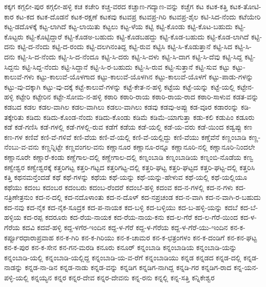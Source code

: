 {ಕಕ್ಕಗ
ಕಗ್ಗಲೀ-ಪುರ
ಕಗ್ಗಲೀ-ಹಳ್ಳಿ
ಕಚ
ಕಚೇರಿ
ಕಚ್ಚ-ವರದ
ಕಚ್ಚಾಣ-ಗದ್ಯಾಣ-ವನ್ನು
ಕಚ್ಚೆಗ
ಕಟ
ಕಟಕ-ಕತ್ತಿ
ಕಟಕ-ತೋಟಿ-ಕಾರ
ಕಟ-ಕದ
ಕಟಕ-ದೊಡನೆ
ಕಟಕ-ರಕ್ಷಣೆ
ಕಟಕವು
ಕಟವಪ್ರ
ಕಟವಪ್ರ-ಗಿರಿ
ಕಟವಪ್ರ-ಶೈಲ
ಕಟಿ-ಸಿದ-ನೆಂದು
ಕಟೆಯೇರಿ
ಕಟ್ಟ-ಡದೊಳಕ್ಕೆ
ಕಟ್ಟ-ಲಾಗಿದೆ
ಕಟ್ಟ-ಲಾಯಿತು
ಕಟ್ಟಲು
ಕಟ್ಟ-ಳೆಯ
ಕಟ್ಟಿ
ಕಟ್ಟಿ-ಕೊಂಡು
ಕಟ್ಟಿ-ಕೊಟ-ಬಹುದು
ಕಟ್ಟಿ-ಕೊಟ್ಟರು
ಕಟ್ಟಿ-ಕೊಟ್ಟಿದ್ದಾರೆ
ಕಟ್ಟಿ-ಕೊಡಅ-ಬಹುದು
ಕಟ್ಟಿ-ಕೊಡಬಹದ್ದು
ಕಟ್ಟಿ-ಕೊಡ-ಬಹುದು
ಕಟ್ಟಿ-ಕೊಡ-ಲಾಗಿದೆ
ಕಟ್ಟಿ-ದನು
ಕಟ್ಟಿ-ದ-ನೆಂದು
ಕಟ್ಟಿ-ದ-ರಂದು
ಕಟ್ಟಿ-ದಲಗಿನಂತಿದ್ದ
ಕಟ್ಟಿ-ರುವ
ಕಟ್ಟಿಸಿ
ಕಟ್ಟಿ-ಸಿ-ಕೊಡುತ್ತಾನೆ
ಕಟ್ಟಿ-ಸಿದ
ಕಟ್ಟಿ-ಸಿ-ದನು
ಕಟ್ಟಿ-ಸಿ-ದ-ನೆಂದು
ಕಟ್ಟಿ-ಸಿ-ದ-ನೆಂದೂ
ಕಟ್ಟಿ-ಸಿ-ದರು
ಕಟ್ಟಿ-ಸಿ-ದಳು
ಕಟ್ಟಿ-ಸಿ-ದಾಗ
ಕಟ್ಟಿ-ಸಿ-ದೆವು
ಕಟ್ಟಿ-ಸಿದ್ದ
ಕಟ್ಟಿ-ಸಿದ್ದನು
ಕಟ್ಟಿ-ಸಿದ್ದ-ನೆಂದು
ಕಟ್ಟಿ-ಸಿದ್ದಾನೆ
ಕಟ್ಟಿ-ಸಿ-ರ-ಬಹುದು
ಕಟ್ಟಿ-ಸಿ-ರುವ
ಕಟ್ಟಿ-ಸುತ್ತಾನೆ
ಕಟ್ಟಿ-ಸುವ
ಕಟ್ಟು
ಕಟ್ಟು-ಕಾಲುವೆ-ಗಳು
ಕಟ್ಟು-ಕಾಲುವೆ-ಯೊಳಗಾದ
ಕಟ್ಟು-ಕಾಲುವೆ-ಯೊಳಗಿನ
ಕಟ್ಟು-ಕಾಲುವೆ-ಯೊಳಗೆ
ಕಟ್ಟು-ಪಾಡು-ಗಳನ್ನು
ಕಟ್ಟು-ವು-ದಕ್ಕಾಗಿ
ಕಟ್ಟು-ವು-ದಕ್ಕೆ
ಕಟ್ಟೆ-ಕಾಲುವೆ-ಗಳನ್ನು
ಕಟ್ಟೆ-ಕೇತ-ನ-ಹಳ್ಳಿ
ಕಟ್ಟೆಯ
ಕಟ್ಟೆ-ಯನ್ನು
ಕಟ್ಟೆ-ಯಲ್ಲಿ
ಕಟ್ಟೇನ-ಹಳ್ಳಿ
ಕಟ್ಟೇರಿ
ಕಟ್ಟೇರಿನ
ಕಟ್ಟೇ-ಸೋಮ-ನ-ಹಳ್ಳಿ
ಕಠಾರಿ
ಕಠಾರಿ-ರಾಯ
ಕಠಾರಿ-ರಾಯ-ರಾದ
ಕಠಾರಿ-ಸಾಳುವ
ಕಡತ-ವನ್ನು
ಕಡಬದ
ಕಡಲ
ಕಡಲ-ವಾಗಿಲ
ಕಡಲ-ವಾಗಿಲು
ಕಡಲು-ವಾಗಿಲು
ಕಡವು
ಕಡವು-ಅಪ್ಪು
ಕಡ-ವೂರ
ಕಡಾರಂನ್ನು
ಕಡಿ-ತಕ್ಕೇರಿತು
ಕಡಿದು
ಕಡಿದು-ಕೊಂಡ-ನೆಂದು
ಕಡಿದು-ಕೊಂಡು
ಕಡಿಮೆ
ಕಡಿಮೆ-ಯಾಗುತ್ತಾ
ಕಡು-ಕಲಿ
ಕಡುಪಿಂ
ಕಡೂರು
ಕಡೆ
ಕಡೆ-ಗಣಿಸಿ
ಕಡೆ-ಗಳಲ್ಲಿ
ಕಡೆ-ಗಳಲ್ಲಿ-ರುವ
ಕಡೆಗೆ
ಕಡೆಯ
ಕಡೆ-ಯಲ್ಲಿ
ಕಡೆ-ಯ-ವರು
ಕಡೆ-ಯಿಂದ
ಕಡ್ವಪ್ಪು
ಕಣ
ಕಣ-ಗಳ
ಕಣಿವೆ
ಕಣಿ-ವೆ-ಗಳಿವೆ
ಕಣಿ-ವೆಯ
ಕಣಿ-ವೆ-ಯಲ್ಲಿ
ಕಣಿ-ವೆ-ಯಲ್ಲಿದ್ದು
ಕಣಿ-ವೆಯು
ಕಣ್ಡೆವೆನೆ
ಕಣ್ಣಂಬಾಡಿ
ಕಣ್ಣ-ನೆಂಬು-ವ-ವನು
ಕಣ್ಣನ್ನಿಟ್ಟೇ
ಕಣ್ಣವಂಗಲ-ವನು
ಕಣ್ಣಾನೂರ
ಕಣ್ಣಾನೂ-ರನ್ನೂ
ಕಣ್ಣಾನೂರಿ-ನಲ್ಲಿ
ಕಣ್ಣಾನೂರಿ-ನಿಂದಲೇ
ಕಣ್ಣಾನೂರೇ
ಕಣ್ಣಾರೆ-ಕಂಡು
ಕಣ್ಣೆಗಾಲ-ದಲ್ಲಿ
ಕಣ್ಣೇಗಾಲ-ದಲ್ಲಿ
ಕಣ್ನಂಬಾಡಿ
ಕಣ್ನಂಬಾಡಿಯ
ಕಣ್ನಂಬಿ-ನೊಡೆಯ
ಕಣ್ವ
ಕಣ್ವೇಶ್ವರ
ಕಣ್ವೇಶ್ವರಕ್ಕೆ
ಕತ್ತರಿಗಟ್ಟ
ಕತ್ತರಿ-ಗಟ್ಟದ
ಕತ್ತರಿಗಟ್ಟ-ದಲ್ಲಿ
ಕತ್ತರಿ-ಘಟ್ಟ
ಕತ್ತರಿ-ಘಟ್ಟದ
ಕತ್ತರಿ-ಘಟ್ಟ-ದಲ್ಲಿ
ಕತ್ತರಿಸಿ
ಕತ್ತಿ
ಕಥನಮನ್ತೆಂದಡೆ
ಕಥೆ
ಕಥೆ-ಗಳನ್ನು
ಕಥೆಯ
ಕಥೆ-ಯನ್ನು
ಕಥೆ-ಯನ್ನು-ಹೇಳುವ
ಕಥೆ-ಯಲ್ಲಿ
ಕಥೆ-ಯಲ್ಲಿಯೂ
ಕಥೆಯು
ಕದಂಬ
ಕದಂಬರ
ಕದಂಬರು
ಕದಂಬ-ರೆಂದರೆ
ಕದಂಬೆ-ಹಳ್ಳಿ
ಕದಂವ
ಕದ-ನ-ಗಳಲ್ಲಿ
ಕದ-ನ-ಗಳು
ಕದ-ನತ್ರಿಣೇತ್ರನುಂ
ಕದ-ನ-ದಲ್ಲಿ
ಕದ-ನದೊಳಾಂತು
ಕದ-ನ-ದೊಳ್
ಕದ-ನಪ್ರಚಂಡ
ಕದ-ನ-ವಾಗಿ
ಕದ-ನ-ವಾಗಿ-ರ-ಬಹುದು
ಕದ-ನವು
ಕದ-ನೈಕ
ಕದ-ನೈಕ-ಸೂದ್ರಕ
ಕದ-ಪ-ನಾಯಕ
ಕದ-ಬಳ್ಳಿ
ಕದ-ಬಳ್ಳಿಯು
ಕದ-ಬ-ಹಳ್ಳಿ-ಯನ್ನು
ಕದಬೆ
ಕದ-ಬೆ-ಹಳ್ಳಿಯ
ಕದ-ರಪ್ಪ
ಕದರೂರು
ಕದ-ರೆಯ-ನಾಯಕ
ಕದ-ರೆಯ-ನಾಯ-ಕನು
ಕದ-ಲ-ಗೆರೆ
ಕದ-ಲ-ಗೆರೆ-ಯಿಂದ
ಕದ-ಳ-ಗೆರೆಯ
ಕದವಿ
ಕದವೆ-ಹಳ್ಳಿ
ಕದ್ದ-ಳಗೆರ-ಇಂದಿನ
ಕದ್ದ-ಳ-ಗೆರೆ
ಕದ್ದ-ಳ-ಗೆರೆಯ
ಕದ್ದ-ಳ-ಗೆರೆ-ಯು-ಇಂದಿನ
ಕನ-ಕ-ಕರ್ಪ್ಪೂರಧಾರಾಪ್ರವಾಹ
ಕನ-ಕ-ಗಿರಿ
ಕನ-ಕ-ಗಿರಿಯು
ಕನ-ಕ-ಚಾಮರ
ಕನ-ಕ-ಛತ್ರಂಗಳಂ
ಕನ-ಕ-ದಂಡಿಗೆ
ಕನ-ಕನ-ಘಟ್ಟ
ಕನ-ಕ-ಪುರ
ಕನ-ಕ-ಸೇನ
ಕನ-ಗನ-ಮರಡಿ
ಕನೂರು
ಕನೂರ್
ಕನ್ನಂಬಾಡಿ
ಕನ್ನಂಬಾಡಿಯ
ಕನ್ನಂಬಾಡಿ-ಯನ್ನು
ಕನ್ನಂಬಾಡಿ-ಯಲ್ಲಿ
ಕನ್ನಂಬಾಡಿ-ಯಲ್ಲಿದ್ದ
ಕನ್ನಂಬಾಡಿ-ಯ-ವ-ರೆಗೆ
ಕನ್ನಂಬಾಡಿಯು
ಕನ್ನಡ
ಕನ್ನಡದ
ಕನ್ನಡ-ದಲ್ಲಿ
ಕನ್ನಡ-ನಾಡನ್ನು
ಕನ್ನಡ-ನಾ-ಡಿನ
ಕನ್ನಡ-ನಾಡು
ಕನ್ನಡ-ವನ್ನು
ಕನ್ನಡಿಗ
ಕನ್ನಡಿಗ-ನಾಗಿದ್ದ
ಕನ್ನಡಿ-ಗರ
ಕನ್ನಡಿಗ-ರಾದ
ಕನ್ನ-ಯನ-ಪಳ್ಳಿ-ಯಲ್ಲಿ
ಕನ್ನಯ್ಯನ
ಕನ್ನರ
ಕನ್ನರ-ದೇವ
ಕನ್ನರ-ದೇವನು
ಕನ್ನ-ರನು
ಕನ್ನಲ್ಲಿ
ಕನ್ನ-ಸತ್ತಿ
ಕನ್ನಿಕೇಶ್ವರ
}

